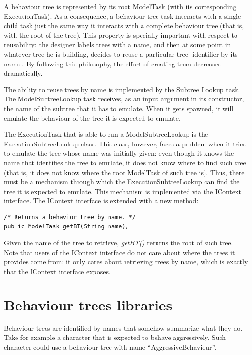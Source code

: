 \documentclass[a4paper,10pt]{article}
\begin{document}
A behaviour tree is represented by its root ModelTask (with its corresponding ExecutionTask). As a consequence, a behaviour tree task interacts with a single child task just the same way it interacts with a complete behaviour tree (that is, with the root of the tree). This property is specially important with respect to reusability: the designer labels trees with a name, and then at some point in whatever tree he is building, decides to reuse a particular tree -identifier by its name-. By following this philosophy, the effort of creating trees decreases dramatically.

The ability to reuse trees by name is implemented by the Subtree Lookup task. The ModelSubtreeLookup task receives, as an input argument in its constructor, the name of the subtree that it has to emulate. When it gets spawned, it will emulate the behaviour of the tree it is expected to emulate.

The ExecutionTask that is able to run a ModelSubtreeLookup is the ExecutionSubtreeLookup class. This class, however, faces a problem when it tries to emulate the tree whose name was initially given: even though it knows the name that identifies the tree to emulate, it does not know where to find such tree (that is, it does not know where the root ModelTask of such tree is). Thus, there must be a mechanism through which the ExecutionSubtreeLookup can find the tree it is expected to emulate. This mechanism is implemented via the IContext interface. The IContext interface
is extended with a new method:

\begin{verbatim}
/* Returns a behavior tree by name. */ 
public ModelTask getBT(String name);
\end{verbatim}

Given the name of the tree to retrieve, \textit{getBT()} returns the root of such tree. Note that users of the IContext interface do not care about where the trees it provides come from; it only cares about retrieving trees by name, which is exactly that the IContext interface exposes.

\section{Behaviour trees libraries}

Behaviour trees are identified by names that somehow summarize what they do. Take for example a character that is expected to behave aggressively. Such character could use a behaviour tree with name ``AggressiveBehaviour''.
\end{document}
